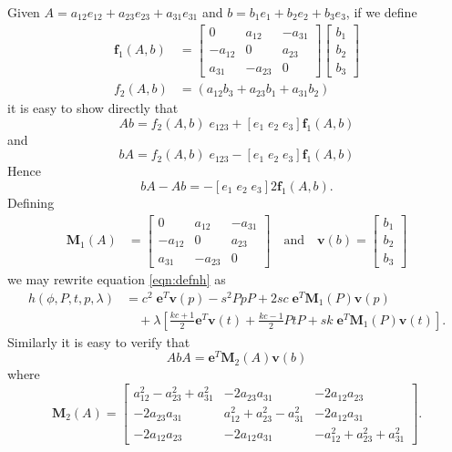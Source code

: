 Given $A = a_{12}e_{12} + a_{23}e_{23} + a_{31}e_{31}$ and
$b = b_1e_1 + b_2e_2 + b_3e_3$, if we define
\begin{align*}
\mathbf{f}_1(A,b) &=
\left[ 
\begin{array}{ccc}
0 & a_{12} & - a_{31} \\
- a_{12} & 0 & a_{23}\\
a_{31} & - a_{23} & 0 
\end{array} 
\right]  
\left[ 
\begin{array}{c}
b_1 \\ b_2 \\ b_3
\end{array} 
\right]  
\\
f_2(A,b) &= (a_{12}b_{3} + a_{23}b_1 + a_{31}b_2) 
\end{align*}
it is easy to show directly that
\[
Ab =
f_2(A,b)\;e_{123} +
\left[ e_1 \; e_2 \; e_3 \right]
 \mathbf{f}_1(A,b)
\]
and
\[
bA =
f_2(A,b)\;e_{123} - 
\left[ e_1 \; e_2 \; e_3 \right]
\mathbf{f}_1(A,b)
\]
Hence
\[
bA - Ab = -
\left[ e_1 \; e_2 \; e_3 \right]
2\mathbf{f}_1(A,b).
\]
Defining
\begin{align*}
\mathbf{M}_1(A) &= \left[ 
\begin{array}{ccc}
0 & a_{12} & - a_{31} \\
- a_{12} & 0 & a_{23}\\
a_{31} & - a_{23} & 0 
\end{array} 
\right]  \quad\mathrm{and}\quad
\mathbf{v}(b) = \left[ 
\begin{array}{c}
b_1 \\
b_2 \\
b_3 
\end{array} 
\right]  
\end{align*}
we may rewrite equation \ref{eqn:defnh} as
\begin{align*}
h(\phi, P, t, p, \lambda) &= c^2\;\mathbf{e}^T\mathbf{v}(p) - s^2PpP + 2sc\;\mathbf{e}^T\mathbf{M}_1(P)\mathbf{v}(p) \\
&\quad+ \lambda\left[ 
 \frac{kc+1}{2} \mathbf{e}^T\mathbf{v}(t) + \frac{kc-1}{2} PtP
+ sk\;\mathbf{e}^T\mathbf{M}_1(P)\mathbf{v}(t)
\right].
\end{align*}
Similarly it is easy to verify that
\[
AbA = \mathbf{e}^T \mathbf{M}_2(A) \mathbf{v}(b)
\]
where
\[
\mathbf{M}_2(A)  =
\left[
\begin{array}{ccc}
a^2_{12} - a^2_{23} + a^2_{31} &  - 2a_{23}a_{31} & - 2a_{12}a_{23} \\
- 2a_{23}a_{31} & a^2_{12} + a^2_{23} - a^2_{31} & - 2a_{12}a_{31}  \\
- 2a_{12}a_{23} & - 2a_{12}a_{31} &  -a^2_{12} + a^2_{23} + a^2_{31} 
\end{array}
\right].
\]
